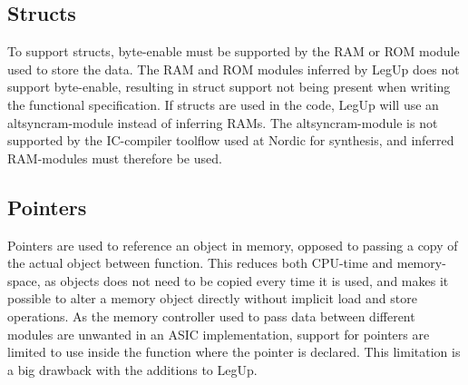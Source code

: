 \subsection{Structs}
To support structs, byte-enable must be supported by the RAM or ROM module used to store the data. The RAM and ROM modules inferred by LegUp does not support byte-enable, resulting in struct support not being present when writing the functional specification. If structs are used in the code, LegUp will use an altsyncram-module instead of inferring RAMs. The altsyncram-module is not supported by the IC-compiler toolflow used at Nordic for synthesis, and inferred RAM-modules must therefore be used. 
\subsection{Pointers}
Pointers are used to reference an object in memory, opposed to passing a copy of the actual object between function. This reduces both CPU-time and memory-space, as objects does not need to be copied every time it is used, and makes it possible to alter a memory object directly without implicit load and store operations. As the memory controller used to pass data between different modules are unwanted in an ASIC implementation, support for pointers are limited to use inside the function where the pointer is declared. This limitation is a big drawback with the additions to LegUp.
\subsection{}
